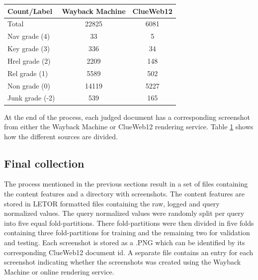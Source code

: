 \begin{table}[h]
  \begin{tabular}{ l | c | c  }
    Count/Label & Wayback Machine & ClueWeb12 \\
    \hline
    Total & 22825 & 6081 \\
    Nav grade (4) & 33 & 5 \\
    Key grade (3) & 336 & 34 \\
    Hrel grade (2) & 2209 & 148 \\
    Rel grade (1) & 5589 & 502 \\
    Non grade (0) & 14119 & 5227 \\
    Junk grade (-2) & 539 & 165 \\
    \hline
  \end{tabular}
   \label{tab:countsources} 
\end{table}

At the end of the process, each judged document has a corresponding screenshot from either the Wayback Machine or ClueWeb12 rendering service. Table \ref{tab:countsources} shows how the different sources are divided.

\subsection{Final collection}
The process mentioned in the previous sections result in a set of files containing the content features and a directory with screenshots. The content features are stored in LETOR formatted files containing the raw, logged and query normalized values. The query normalized values were randomly split per query into five equal fold-partitions. There fold-partitions were then divided in five folds containing three fold-partitions for training and the remaining two for validation and testing. Each screenshot is stored as a .PNG which can be identified by its corresponding ClueWeb12 document id. A separate file contains an entry for each screenshot indicating whether the screenshots was created using the Wayback Machine or online rendering service. 

